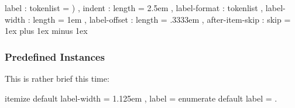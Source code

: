 \documentclass{tasks-manual}
\begin{document}
\begin{sourcecode}
    {
      label           : tokenlist = \alph*) ,
      indent          : length    = 2.5em   ,
      label-format    : tokenlist           ,
      label-width     : length    = 1em     ,
      label-offset    : length    = .3333em ,
      after-item-skip : skip      = 1ex plus 1ex minus 1ex
    }
\end{sourcecode}

\subsubsection{Predefined Instances}
This is rather brief this time:
\begin{sourcecode}
   {itemize} {default}
    {
      label-width  = 1.125em ,
      label        = 
    }
   {enumerate} {default}
    { label = \arabic*. }
\end{sourcecode}

\clearpage
\printbibliography
\end{document}
